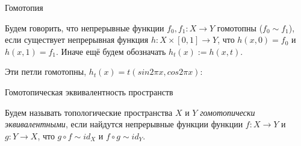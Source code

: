 \documentclass[aspectratio=169,dvipsnames,usenames]{beamer}
\begin{document}
\begin{frame}{Гомотопия}
\begin{dfn}
Будем говорить, что непрерывные функции $f_0,f_1: X \rightarrow Y$ гомотопны ($f_0 \sim f_1$), если существует непрерывная функция
$h: X \times [0,1] \rightarrow Y$, что $h(x,0) = f_0$ и $h(x,1) = f_1$. Иначе ещё будем обозначать $h_t(x) := h(x,t)$.
\end{dfn}


\begin{exm}
Эти петли гомотопны, $h_t(x) = t (sin 2\pi x, cos 2\pi x)$:

\vspace{-0.3cm}
\begin{center}\end{center}
\end{exm}

\end{frame}


\begin{frame}{Гомотопическая эквивалентность пространств}
\begin{dfn}
Будем называть топологические пространства $X$ и $Y$ \emph{гомотопически эквивалентными}, если найдутся непрерывные функции
функции $f : X \rightarrow Y$ и $g : Y \rightarrow X$, что $g \circ f \sim id_X$ и $f \circ g \sim id_Y$.
\end{dfn}
\end{frame}
\end{document}
